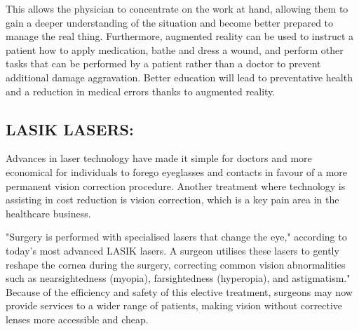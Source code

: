 \documentclass[12pt]{article}
\begin{document}
This allows the physician to concentrate on the work at hand, allowing them to gain a deeper understanding of the situation and become better prepared to manage the real thing. Furthermore, augmented reality can be used to instruct a patient how to apply medication, bathe and dress a wound, and perform other tasks that can be performed by a patient rather than a doctor to prevent additional damage aggravation. Better education will lead to preventative health and a reduction in medical errors thanks to augmented reality.

\subsection{LASIK LASERS:}

Advances in laser technology have made it simple for doctors and more economical for individuals to forego eyeglasses and contacts in favour of a more permanent vision correction procedure. Another treatment where technology is assisting in cost reduction is vision correction, which is a key pain area in the healthcare business.


"Surgery is performed with specialised lasers that change the eye," according to today's most advanced LASIK lasers. A surgeon utilises these lasers to gently reshape the cornea during the surgery, correcting common vision abnormalities such as nearsightedness (myopia), farsightedness (hyperopia), and astigmatism." Because of the efficiency and safety of this elective treatment, surgeons may now provide services to a wider range of patients, making vision without corrective lenses more accessible and cheap.
\end{document}
